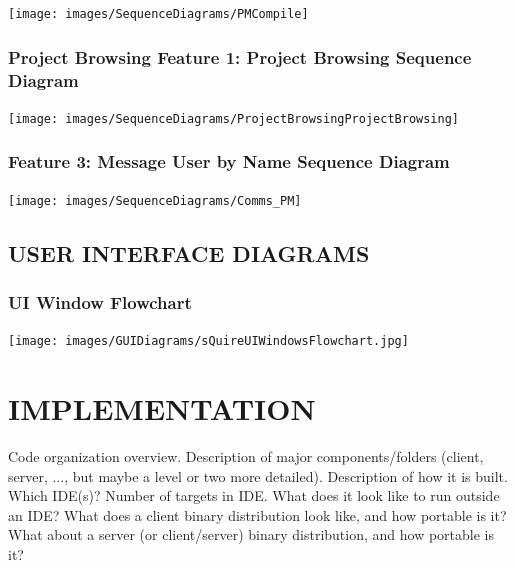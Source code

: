 \documentclass[twoside,letterpaper]{article}
\begin{document}
	\bigskip
	
	\texttt{[image: images/SequenceDiagrams/PMCompile]}
	\label{pm:sd1}
	
	\newpage


	\subsubsection[Project Browsing Feature 1: Project Browsing Sequence Diagram]{\rmfamily\bfseries\color{black}
		Project Browsing Feature 1: Project Browsing Sequence Diagram}
	\hypertarget{RefHeading22059017292}{}
	
	\bigskip
	
	\texttt{[image: images/SequenceDiagrams/ProjectBrowsingProjectBrowsing]}
	\label{pb:sd1}
	
	\newpage

	\subsubsection[Communication Feature 3: Message User by Name Sequence Diagram]{\rmfamily\bfseries\color{black}
		Feature 3: Message User by Name Sequence Diagram}
	\hypertarget{RefHeading22059017292}{}
	
	\bigskip
	
	\texttt{[image: images/SequenceDiagrams/Comms\_PM]}
	
	\newpage


\subsection[USER INTERFACE DIAGRAMS]{\rmfamily\bfseries USER INTERFACE DIAGRAMS}
\subsubsection[UI Window Flowchart]{\rmfamily\bfseries\color{black}
	UI Window Flowchart}
\texttt{[image: images/GUIDiagrams/sQuireUIWindowsFlowchart.jpg]}
\newpage

\section[IMPLEMENTATION]{\rmfamily\bfseries\color{black} IMPLEMENTATION}

Code organization overview. Description of major components/folders (client, server, ..., but maybe a level or two more detailed). Description of how it is built. Which IDE(s)? Number of targets in IDE. What does it look like to run outside an IDE? What does a client binary distribution look like, and how portable is it? What about a server (or client/server) binary distribution, and how portable is it?
\end{document}
